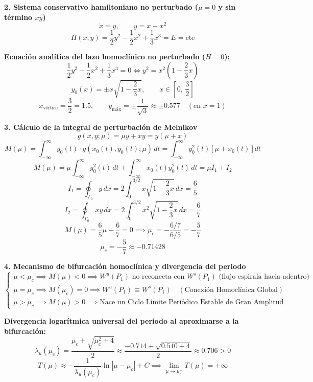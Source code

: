 \documentclass[11pt,a4paper]{article}
\newenvironment{solucion}[1][Solución Detallada]{%
    \vspace{1.5mm}%
    \noindent{\large\textbf{Solución:}}\par\vspace{1.5mm}%
}{%
    \par\vspace{3mm}%
}
\begin{document}
\begin{solucion}
\vspace{3.5mm}

\textbf{\large 2. Sistema conservativo hamiltoniano no perturbado ($\mu = 0$ y sin término $xy$)}
\[
\dot{x} = y, \qquad \dot{y} = x - x^2
\]
\[
H(x, y) = \frac{1}{2}y^2 - \frac{1}{2}x^2 + \frac{1}{3}x^3 = E = \text{cte}
\]

\textbf{Ecuación analítica del lazo homoclínico no perturbado ($H = 0$):}
\[
\frac{1}{2}y^2 - \frac{1}{2}x^2 + \frac{1}{3}x^3 = 0 \iff y^2 = x^2\left(1 - \frac{2}{3}x\right)
\]
\[
\boxed{y_0(x) = \pm x\sqrt{1 - \frac{2}{3}x}, \qquad x \in \left[0, \, \frac{3}{2}\right]}
\]
\[
x_{\text{vértice}} = \frac{3}{2} = 1.5, \qquad y_{\text{máx}} = \pm\frac{1}{\sqrt{3}} \approx \pm 0.577 \quad (\text{en } x = 1)
\]

\vspace{3.5mm}

\textbf{\large 3. Cálculo de la integral de perturbación de Melnikov}
\[
g(x, y; \mu) = \mu y + xy = y(\mu + x)
\]
\[
M(\mu) = \int_{-\infty}^{\infty} y_0(t) \cdot g(x_0(t), y_0(t); \mu)\, dt = \int_{-\infty}^{\infty} y_0^2(t)\left[\mu + x_0(t)\right] dt
\]
\[
M(\mu) = \mu \int_{-\infty}^{\infty} y_0^2(t)\, dt + \int_{-\infty}^{\infty} x_0(t) y_0^2(t)\, dt = \mu I_1 + I_2
\]
\[
I_1 = \oint_{\Gamma_0} y\, dx = 2\int_0^{3/2} x\sqrt{1 - \frac{2}{3}x}\, dx = \frac{6}{5}
\]
\[
I_2 = \oint_{\Gamma_0} xy\, dx = 2\int_0^{3/2} x^2\sqrt{1 - \frac{2}{3}x}\, dx = \frac{6}{7}
\]
\[
M(\mu) = \frac{6}{5}\mu + \frac{6}{7} = 0 \implies \mu_c = -\frac{6/7}{6/5} = -\frac{5}{7}
\]
\[
\boxed{\mu_c = -\frac{5}{7} \approx -0.71428}
\]

\vspace{3.5mm}

\textbf{\large 4. Mecanismo de bifurcación homoclínica y divergencia del periodo}
\[
\begin{cases}
\mu < \mu_c \implies M(\mu) < 0 \implies W^u(P_1) \text{ no reconecta con } W^s(P_1) \text{ (flujo espirala hacia adentro)} \\
\mu = \mu_c \implies M(\mu_c) = 0 \implies \boxed{W^u(P_1) \equiv W^s(P_1) \quad (\text{Conexión Homoclínica Global})} \\
\mu > \mu_c \implies M(\mu) > 0 \implies \boxed{\text{Nace un Ciclo Límite Periódico Estable de Gran Amplitud}}
\end{cases}
\]

\textbf{Divergencia logarítmica universal del periodo al aproximarse a la bifurcación:}
\[
\lambda_u(\mu_c) = \frac{\mu_c + \sqrt{\mu_c^2 + 4}}{2} \approx \frac{-0.714 + \sqrt{0.510 + 4}}{2} \approx 0.706 > 0
\]
\[
\boxed{T(\mu) \approx -\frac{1}{\lambda_u(\mu_c)} \ln|\mu - \mu_c| + C \implies \lim_{\mu \to \mu_c^+} T(\mu) = +\infty}
\]


\end{solucion}
\end{document}
